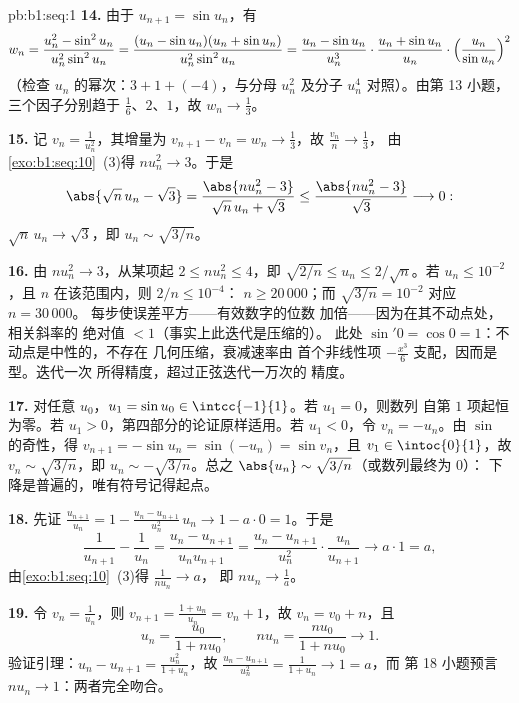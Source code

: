 \begin{solution}{pb:b1:seq:1}
\textbf{14.} 由于 $u_{n+1} = \sin u_n$，有
\[
w_n = \frac{u_n^2 - \sin^2 u_n}{u_n^2 \sin^2 u_n}
= \frac{(u_n - \sin u_n)(u_n + \sin u_n)}{u_n^2 \sin^2 u_n}
= \frac{u_n - \sin u_n}{u_n^3}\cdot
\frac{u_n + \sin u_n}{u_n}\cdot
\Bigl(\frac{u_n}{\sin u_n}\Bigr)^{2}
\]
（检查 $u_n$ 的幂次：$3 + 1 + (-4)$，与分母 $u_n^2$
及分子 $u_n^4$ 对照）。由第 13 小题，
三个因子分别趋于 $\frac16$、$2$、$1$，故 $w_n \to \frac13$。

\textbf{15.} 记 $v_n = \frac{1}{u_n^2}$，其增量为 $v_{n+1} -
v_n = w_n \to \frac13$，故 $\frac{v_n}{n} \to \frac13$，
由\cref{exo:b1:seq:10}~(3)得 $n u_n^2 \to 3$。于是
\[
\abs{\sqrt n\,u_n - \sqrt 3}
= \frac{\abs{n u_n^2 - 3}}{\sqrt n\,u_n + \sqrt 3}
\leq \frac{\abs{n u_n^2 - 3}}{\sqrt 3} \longrightarrow 0 :
\]
$\sqrt n\,u_n \to \sqrt 3$，即 $u_n \sim \sqrt{3/n}$。

\textbf{16.} 由 $n u_n^2 \to 3$，从某项起 $2 \leq n u_n^2
\leq 4$，即 $\sqrt{2/n} \leq u_n \leq 2/\sqrt n$。若 $u_n
\leq 10^{-2}$，且 $n$ 在该范围内，则 $2/n \leq 10^{-4}$：
$n \geq 20\,000$；而 $\sqrt{3/n} = 10^{-2}$ 对应 $n = 30\,000$。
每步使误差平方——有效数字的位数
加倍——因为在其不动点处，相关斜率的
绝对值 $< 1$（事实上此迭代是压缩的）。
此处 $\sin' 0 = \cos 0 = 1$：不动点是中性的，不存在
几何压缩，衰减速率由
首个非线性项 $-\frac{x^3}{6}$ 支配，因而是型。迭代一次
所得精度，超过正弦迭代一万次的
精度。

\textbf{17.} 对任意 $u_0$，$u_1 = \sin u_0 \in
\intcc{-1}{1}$。若 $u_1 = 0$，则数列
自第 $1$ 项起恒为零。若 $u_1 > 0$，第四部分的论证原样适用。若 $u_1 < 0$，令
$v_n = -u_n$。由 $\sin$ 的奇性，得 $v_{n+1} = -\sin u_n =
\sin(-u_n) = \sin v_n$，且 $v_1 \in \intoc{0}{1}$，故 $v_n \sim
\sqrt{3/n}$，即 $u_n \sim -\sqrt{3/n}$。总之
$\abs{u_n} \sim \sqrt{3/n}$（或数列最终为 $0$）：
下降是普遍的，唯有符号记得起点。

\textbf{18.} 先证 $\frac{u_{n+1}}{u_n} = 1 - \frac{u_n -
u_{n+1}}{u_n^2}\,u_n \to 1 - a \cdot 0 = 1$。于是
\[
\frac{1}{u_{n+1}} - \frac{1}{u_n}
= \frac{u_n - u_{n+1}}{u_n u_{n+1}}
= \frac{u_n - u_{n+1}}{u_n^2}\cdot\frac{u_n}{u_{n+1}}
\longrightarrow a \cdot 1 = a ,
\]
由\cref{exo:b1:seq:10}~(3)得 $\frac{1}{n u_n} \to a$，
即 $n u_n \to \frac1a$。

\textbf{19.} 令 $v_n = \frac{1}{u_n}$，则 $v_{n+1} = \frac{1 +
u_n}{u_n} = v_n + 1$，故 $v_n = v_0 + n$，且
\[
u_n = \frac{u_0}{1 + n u_0} , \qquad
n u_n = \frac{n u_0}{1 + n u_0} \longrightarrow 1 .
\]
验证引理：$u_n - u_{n+1} = \frac{u_n^2}{1 + u_n}$，故
$\frac{u_n - u_{n+1}}{u_n^2} = \frac{1}{1 + u_n} \to 1 = a$，而
第 18 小题预言 $n u_n \to 1$：两者完全吻合。


\end{solution}
